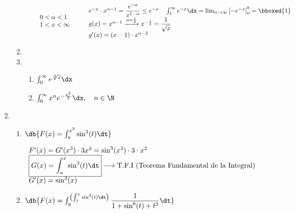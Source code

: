 \begin{enumerate}[label=\color{red}\textbf{\arabic*)}, leftmargin=*]
\begin{enumerate}[label=\color{red}\alph*)]
\begin{itemize}
            $\begin{array}{l}
                  0<\alpha<1\\
                  1<x<\infty
            \end{array}\qquad \begin{array}{l}
            e^{-x}\cdot x^{\alpha-1}=\dfrac{e^{-x}}{x^{1-\alpha}}\le e^{-x}\quad \int_{1}^{\infty}e^{-x}\dx=\lim_{n\to\infty}\left[-e^{-x}\right]_0^b=\bboxed{1}\\
            g(x)=x^{\alpha-1}\xrightarrow{\alpha=\frac{1}{2}}x^{-\frac{1}{2}}=\dfrac{1}{\sqrt{x}}\\
            g'(x)=(x-1)\cdot x^{\alpha-2}
            \end{array}$
      \end{itemize}
      \item {}
      \item {}
      \begin{enumerate}[label=\color{blue}\alph*)]
            \item $\int_{0}^{\infty}e^{\sqrt[3]{x}}\dx$
            \item $\int_{0}^{\infty}x^ne^{-\frac{x^2}{2}}\dx,\quad n\in\N$
      \end{enumerate}
\end{enumerate}
\item {}
\begin{enumerate}[label=\color{red}\alph*)]
	\item $\db{F(x)=\int_{a}^{x^3}\sin^3(t)\dt}$
	
	$\begin{array}{l}
		F'(x)=G'(x^3)\cdot 3x^2=\sin^3(x^3)\cdot3\cdot x^2\\
		\boxed{G(x)=\int_{a}^{x}\sin^3(t)\dt}\longrightarrow \text{T.F.I (Teorema Fundamental de la Integral)}\\
		G'(x)=\sin^3(x)
	\end{array}$
	\item $\db{F(x)=\int_{y}^{\left(\int_{1}^{x}\sin^3(t)\dt\right)}\dfrac{1}{1+\sin^6(t)+t^2}\dt}$
	

\end{enumerate}
\end{enumerate}
